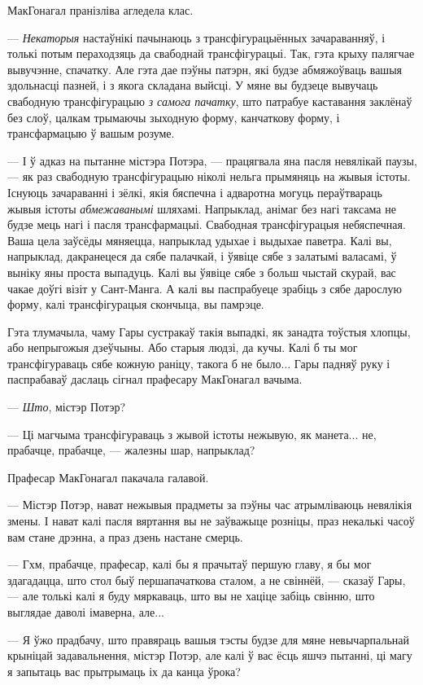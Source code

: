 МакГонагал пранізліва агледела клас.

--- \emph{Некаторыя} настаўнікі пачынаюць з трансфігурацыённых зачараванняў, 
і толькі потым пераходзяць да свабоднай трансфігурацыі. Так, гэта крыху палягчае 
вывучэнне, спачатку. Але гэта дае пэўны патэрн, які будзе абмяжоўваць вашыя 
здольнасці пазней, і з якога складана выйсці. У мяне вы будзеце вывучаць 
свабодную трансфігурацыю \emph{з самога пачатку}, што патрабуе 
каставання заклёнаў без слоў, цалкам трымаючы зыходную форму, канчаткову форму,
і трансфармацыю ў вашым розуме.


--- І ў адказ на пытанне містэра Потэра, --- працягвала яна пасля невялікай паузы, --- 
як раз свабодную трансфігурацыю ніколі нельга прымяняць на жывыя істоты. 
Існуюць зачараванні і зёлкі, якія бяспечна і адваротна могуць пераўтвараць
жывыя істоты \emph{абмежаванымі} шляхамі. Напрыклад, анімаг без нагі таксама не 
будзе мець нагі і пасля трансфармацыі. Свабодная трансфігурацыя небяспечная.
Ваша цела заўсёды мяняецца, напрыклад удыхае і выдыхае паветра. 
Калі вы, напрыклад, дакранецеся да сябе палачкай, і ўявіце 
сябе з залатымі валасамі, ў выніку яны проста выпадуць.
Калі вы ўявіце сябе з больш чыстай скурай, вас чакае доўгі візіт у Сант-Манга. 
А калі вы паспрабуеце зрабіць з сябе дарослую форму, калі 
трансфігурацыя скончыца, вы памрэце.

Гэта тлумачыла, чаму Гары сустракаў такія выпадкі, як занадта тоўстыя хлопцы, або 
непрыгожыя дзеўчыны. Або старыя людзі, да кучы. Калі б ты мог трансфігураваць сябе кожную раніцу,
такога б не было... Гары падняў руку і паспрабаваў даслаць сігнал прафесару МакГонагал
вачыма.

--- \emph{Што}, містэр Потэр?

--- Ці магчыма трансфігураваць з жывой істоты нежывую, як манета... не, прабачце, прабачце,
--- жалезны шар, напрыклад?

Прафесар МакГонагал пакачала галавой.

--- Містэр Потэр, нават нежывыя прадметы за пэўны час атрымліваюць невялікія змены.
І нават калі пасля вяртання вы не заўважыце розніцы, праз некалькі часоў 
вам стане дрэнна, а праз дзень настане смерць.

--- Гхм, прабачце, прафесар, калі бы я прачытаў першую главу, я бы мог здагадацца,
што стол быў першапачаткова сталом, а не свіннёй, --- сказаў Гары, --- 
але толькі калі я буду мяркаваць, што вы не хаціце забіць свінню, 
што выглядае даволі імаверна, але...

--- Я ўжо прадбачу, што правяраць вашыя тэсты будзе для мяне невычарпальнай крыніцай
задавальнення, містэр Потэр, але калі ў вас ёсць яшчэ пытанні, ці магу я запытаць 
вас прытрымаць іх да канца ўрока?

